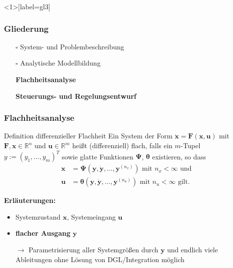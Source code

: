 \documentclass[
	ngerman,
	10pt,				%
	aspectratio=169 	%
]{beamer}
\newcommand{\cdbox}{$\square$\hspace{-0.65em}\raisebox{0.1em}{\checkmark}\hspace{-0.18em}}
\begin{document}

\begin{frame}<1>[label=gl3]
	\frametitle{Gliederung}
	\begin{itemize}
		\item[\cdbox] System- und Problembeschreibung
		\item[\cdbox] Analytische Modellbildung
		\item[\only<1>{$\rightarrow$}\only<2>{$\rightarrow$}\only<3->{\cdbox}]
		\textbf<1>{Flachheitsanalyse}
		\item[\only<1-2>{$\square$}\only<3>{$\rightarrow$}\only<4->{\cdbox}]
		\textbf<2>{Steuerungs- und Regelungsentwurf}
	\end{itemize}
\end{frame}


\begin{frame}[label=Flachheit_1]
	\frametitle{Flachheitsanalyse}
   	\begin{block}{Definition differenzieller Flachheit}
	Ein System der Form $\dot{\mathbf{x}} = \mathbf{F}(\mathbf{x}, \mathbf{u})$ mit $\mathbf{F}, \mathbf{x} \in \mathbb{R}^n$ und $\mathbf{u} \in \mathbb{R}^m$ heißt (differenziell) flach, falls ein $m$-Tupel $y := (y_1, ..., y_m)^T$ sowie glatte Funktionen $\mathbf{\Psi}$, $\boldsymbol{\theta}$ existieren, so dass
	\begin{align*}
			\mathbf{x} &= \mathbf{\Psi}(\mathbf{y}, \dot{\mathbf{y}}, ..., \mathbf{y}^{(n_x)}) \text{ mit } n_x < \infty \text{ und } \\
			\mathbf{u} &= \boldsymbol{\theta}(\mathbf{y}, \dot{\mathbf{y}}, ..., \mathbf{y}^{(n_u)}) \text{ mit } n_u < \infty \text{ gilt.}
	\end{align*}
	\end{block}

	\pause
	\bigskip
	\textbf{Erläuterungen:}
	\begin{itemize}
		\item Systemzustand $\mathbf{x}$, Systemeingang $\mathbf{u}$ 
		\item \textbf{flacher Ausgang} $\mathbf{y}$
		\item[$\rightarrow$] Parametrisierung aller Systemgrößen durch $\mathbf{y}$ und endlich viele Ableitungen ohne Lösung von DGL/Integration möglich
	\end{itemize}
\end{frame}
\end{document}
